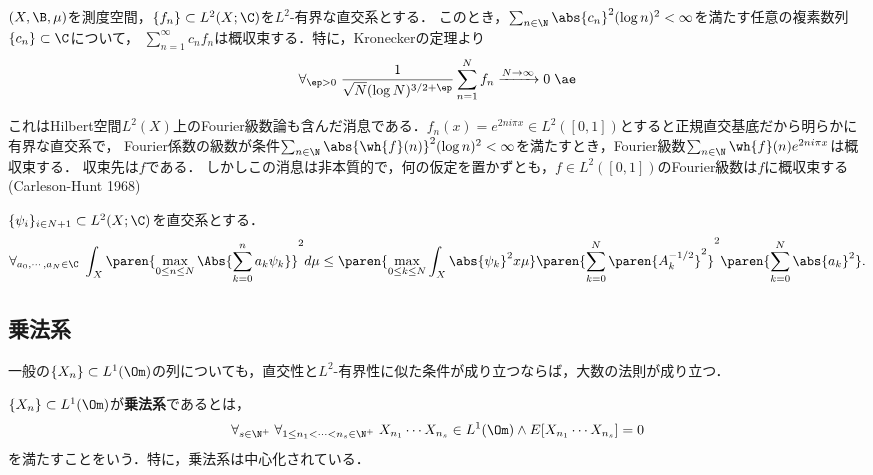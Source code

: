 \documentclass[uplatex,dvipdfmx]{jsreport}
\begin{document}
\begin{theorem}
    $(X,\B,\mu)$を測度空間，$\{f_n\}\subset L^2(X;\C)$を$L^2$-有界な直交系とする．
    このとき，$\sum_{n\in\N}\abs{c_n}^2(\log n)^2<\infty$を満たす任意の複素数列$\{c_n\}\subset\C$について，
    $\sum_{n=1}^\infty c_nf_n$は概収束する．特に，Kroneckerの定理より
    \[\forall_{\ep>0}\;\frac{1}{\sqrt{N}(\log N)^{3/2+\ep}}\sum_{n=1}^Nf_n\xrightarrow{N\to\infty}0\;\ae\]
\end{theorem}
\begin{remarks}
    これはHilbert空間$L^2(X)$上のFourier級数論も含んだ消息である．$f_n(x)=e^{2ni\pi x}\in L^2([0,1])$とすると正規直交基底だから明らかに有界な直交系で，
    Fourier係数の級数が条件$\sum_{n\in\N}\abs{\wh{f}(n)}^2(\log n)^2<\infty$を満たすとき，Fourier級数$\sum_{n\in\N}\wh{f}(n)e^{2ni\pi x}$は概収束する．
    収束先は$f$である．
    しかしこの消息は非本質的で，何の仮定を置かずとも，$f\in L^2([0,1])$のFourier級数は$f$に概収束する(Carleson-Hunt 1968)
\end{remarks}

\begin{proposition}[直交系の最大不等式]
    $\{\psi_i\}_{i\in N+1}\subset L^2(X;\C)$を直交系とする．
    \[\forall_{a_0,\cdots,a_N\in\C}\;\int_X\paren{\max_{0\le n\le N}\Abs{\sum^n_{k=0}a_k\psi_k}}^2d\mu\le\paren{\max_{0\le k\le N}\int_X\abs{\psi_k}^2x\mu}\paren{\sum_{k=0}^N\paren{A_k^{-1/2}}^2}^2\paren{\sum_{k=0}^N\abs{a_k}^2}.\]
\end{proposition}

\subsection{乗法系}

\begin{tcolorbox}[colframe=ForestGreen, colback=ForestGreen!10!white,breakable,colbacktitle=ForestGreen!40!white,coltitle=black,fonttitle=\bfseries\sffamily,
title=]
    一般の$\{X_n\}\subset L^1(\Om)$の列についても，直交性と$L^2$-有界性に似た条件が成り立つならば，大数の法則が成り立つ．
\end{tcolorbox}

\begin{definition}
    $\{X_n\}\subset L^1(\Om)$が\textbf{乗法系}であるとは，
    \[\forall_{s\in\N^+}\;\forall_{1\le n_1<\cdots<n_s\in\N^+}\;X_{n_1}\cdots X_{n_s}\in L^1(\Om)\land E[X_{n_1}\cdots X_{n_s}]=0\]
    を満たすことをいう．特に，乗法系は中心化されている．
\end{definition}
\end{document}
